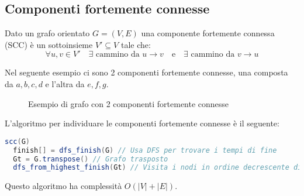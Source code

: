 \documentclass[a4paper]{article}
\begin{document}
\subsection{Componenti fortemente connesse}
\begin{definition}
  Dato un grafo orientato \( G = (V,E) \) una componente fortemente connessa (SCC) è un
  sottoinsieme \( V' \subseteq V \) tale che:
  \[
    \forall u,v \in V' \quad \exists \text{ cammino da } u \to v \quad \text{e} \quad
    \exists \text{ cammino da } v \to u
  \]
\end{definition}
\begin{example}
  Nel seguente esempio ci sono 2 componenti fortemente connesse, una composta da \( a,b,c,d \)
  e l'altra da \( e,f,g \).
  \begin{figure}[H]
    \centering
    \caption{Esempio di grafo con 2 componenti fortemente connesse}
  \end{figure}
\end{example}
L'algoritmo per individuare le componenti fortemente connesse è il seguente:
\begin{lstlisting}[language=Scala]
scc(G)
  finish[] = dfs_finish(G) // Usa DFS per trovare i tempi di fine
  Gt = G.transpose() // Grafo trasposto
  dfs_from_highest_finish(Gt) // Visita i nodi in ordine decrescente di finish
\end{lstlisting}
Questo algoritmo ha complessità \(O(|V| + |E|)\).
\end{document}
